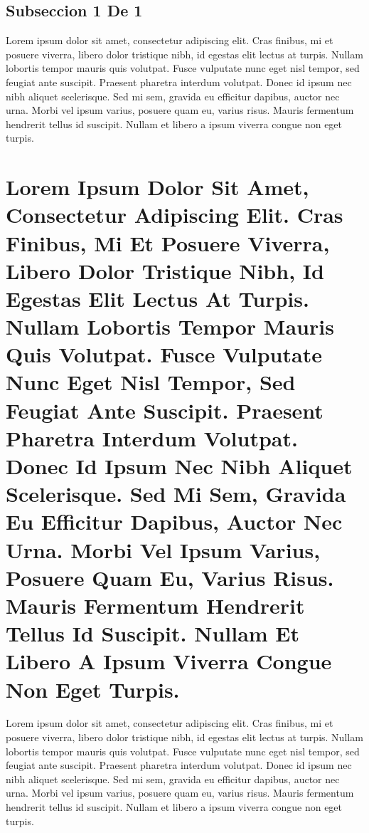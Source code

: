 \documentclass{article}
\begin{document}
\subsection{Subseccion 1 De 1}
Lorem ipsum dolor sit amet, consectetur adipiscing elit. Cras finibus, mi et posuere viverra, libero dolor tristique nibh, id egestas elit lectus at turpis. Nullam lobortis tempor mauris quis volutpat. Fusce vulputate nunc eget nisl tempor, sed feugiat ante suscipit. Praesent pharetra interdum volutpat. Donec id ipsum nec nibh aliquet scelerisque. Sed mi sem, gravida eu efficitur dapibus, auctor nec urna. Morbi vel ipsum varius, posuere quam eu, varius risus. Mauris fermentum hendrerit tellus id suscipit. Nullam et libero a ipsum viverra congue non eget turpis.
\section{Lorem Ipsum Dolor Sit Amet, Consectetur Adipiscing Elit. Cras Finibus, Mi Et Posuere Viverra, Libero Dolor Tristique Nibh, Id Egestas Elit Lectus At Turpis. Nullam Lobortis Tempor Mauris Quis Volutpat. Fusce Vulputate Nunc Eget Nisl Tempor, Sed Feugiat Ante Suscipit. Praesent Pharetra Interdum Volutpat. Donec Id Ipsum Nec Nibh Aliquet Scelerisque. Sed Mi Sem, Gravida Eu Efficitur Dapibus, Auctor Nec Urna. Morbi Vel Ipsum Varius, Posuere Quam Eu, Varius Risus. Mauris Fermentum Hendrerit Tellus Id Suscipit. Nullam Et Libero A Ipsum Viverra Congue Non Eget Turpis.}
Lorem ipsum dolor sit amet, consectetur adipiscing elit. Cras finibus, mi et posuere viverra, libero dolor tristique nibh, id egestas elit lectus at turpis. Nullam lobortis tempor mauris quis volutpat. Fusce vulputate nunc eget nisl tempor, sed feugiat ante suscipit. Praesent pharetra interdum volutpat. Donec id ipsum nec nibh aliquet scelerisque. Sed mi sem, gravida eu efficitur dapibus, auctor nec urna. Morbi vel ipsum varius, posuere quam eu, varius risus. Mauris fermentum hendrerit tellus id suscipit. Nullam et libero a ipsum viverra congue non eget turpis.
\end{document}
